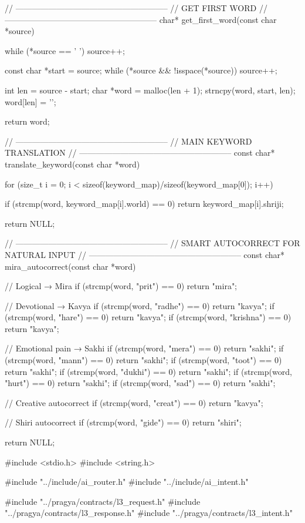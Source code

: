 \documentclass{article}
\begin{document}
// --------------------------------------------------------
// GET FIRST WORD
// --------------------------------------------------------
char* get_first_word(const char *source) {
    while (*source == ' ') source++;

    const char *start = source;
    while (*source && !isspace(*source))
        source++;

    int len = source - start;
    char *word = malloc(len + 1);
    strncpy(word, start, len);
    word[len] = '\0';

    return word;
}

// --------------------------------------------------------
// MAIN KEYWORD TRANSLATION
// --------------------------------------------------------
const char* translate_keyword(const char *word) {

for (size_t i = 0; i < sizeof(keyword_map)/sizeof(keyword_map[0]); i++) {

        if (strcmp(word, keyword_map[i].world) == 0)
            return keyword_map[i].shriji;
    }

    return NULL;
}

// --------------------------------------------------------
// SMART AUTOCORRECT FOR NATURAL INPUT
// --------------------------------------------------------
const char* mira_autocorrect(const char *word) {

    // Logical → Mira
    if (strcmp(word, "prit") == 0) return "mira";

    // Devotional → Kavya
    if (strcmp(word, "radhe") == 0) return "kavya";
    if (strcmp(word, "hare") == 0) return "kavya";
    if (strcmp(word, "krishna") == 0) return "kavya";

    // Emotional pain → Sakhi
    if (strcmp(word, "mera") == 0) return "sakhi";
    if (strcmp(word, "mann") == 0) return "sakhi";
    if (strcmp(word, "toot") == 0) return "sakhi";
    if (strcmp(word, "dukhi") == 0) return "sakhi";
    if (strcmp(word, "hurt") == 0) return "sakhi";
    if (strcmp(word, "sad") == 0) return "sakhi";

    // Creative autocorrect
    if (strcmp(word, "creat") == 0) return "kavya";

    // Shiri autocorrect
    if (strcmp(word, "gide") == 0) return "shiri";

    return NULL;
}
#include <stdio.h>
#include <string.h>

#include "../include/ai_router.h"
#include "../include/ai_intent.h"

#include "../pragya/contracts/l3_request.h"
#include "../pragya/contracts/l3_response.h"
#include "../pragya/contracts/l3_intent.h"
\end{document}
